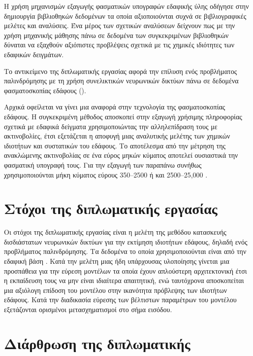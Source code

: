 Η χρήση μηχανισμών εξαγωγής φασματικών υπογραφών εδαφικής ύλης οδήγησε στην δημιουργία βιβλιοθηκών δεδομένων τα οποία αξιοποιούνται συχνά σε βιβλιογραφικές μελέτες και αναλύσεις. Ένα μέρος των σχετικών αναλύσεων δείχνουν πως με την χρήση μηχανικής μάθησης πάνω σε δεδομένα των συγκεκριμένων βιβλιοθηκών δύναται να εξαχθούν αξιόπιστες προβλέψεις σχετικά με τις χημικές ιδιότητες των εδαφικών δειγμάτων.

Το αντικείμενο της διπλωματικής εργασίας αφορά την επίλυση ενός προβλήματος παλινδρόμησης με τη χρήση συνελικτικών νευρωνικών δικτύων πάνω σε δεδομένα φασματοσκοπίας εδάφους ().

Αρχικά οφείλεται να γίνει μια αναφορά στην τεχνολογία της φασματοσκοπίας εδάφους. Η συγκεκριμένη μέθοδος αποσκοπεί στην εξαγωγή χρήσιμης πληροφορίας σχετικά με εδαφικά δείγματα χρησιμοποιώντας την αλληλεπίδραση τους με ακτινοβολίες, έτσι εξετάζεται η αποφυγή μιας αναλυτικής μελέτης των χημικών ιδιοτήτων και συστατικών του εδάφους. Το αποτέλεσμα από την μέτρηση της ανακλώμενης ακτινοβολίας σε ένα εύρος μηκών κύματος αποτελεί ουσιαστικά την φασματική υπογραφή τους. Για την εξαγωγή των παραπάνω συνήθως χρησιμοποιούνται μήκη κύματος εύρους 350–2500  ή και 2500–25,000 .

\section{Στόχοι της διπλωματικής εργασίας}
Οι στόχοι της διπλωματικής εργασίας είναι η μελέτη της μεθόδου κατασκευής δισδιάστατων νευρωνικών δικτύων για την εκτίμηση ιδιοτήτων εδάφους, δηλαδή ενός προβλήματος παλινδρόμησης. Τα δεδομένα το οποία χρησιμοποιούνται είναι από την εδαφική βάση  \cite{lucas_soil}. Κατά την μελέτη μιας ήδη υπάρχουσας υλοποίησης γίνεται μια προσπάθεια για την εύρεση μοντέλων τα οποία έχουν απλούστερη αρχιτεκτονική έτσι η εκπαίδευση τους να μην είναι ιδιαίτερα απαιτητική, ενώ ταυτόχρονα αποσκοπείται μια αξιόλογη επίδοση του μοντέλου στην ικανότητα πρόβλεψης των ιδιοτήτων εδάφους. Κατά την διαδικασία εύρεσης των βέλτιστων παραμέτρων του μοντέλου εξετάζονται ορισμένοι μετασχηματισμοί στο σήμα εισόδου.

\section{Διάρθρωση της διπλωματικής}

